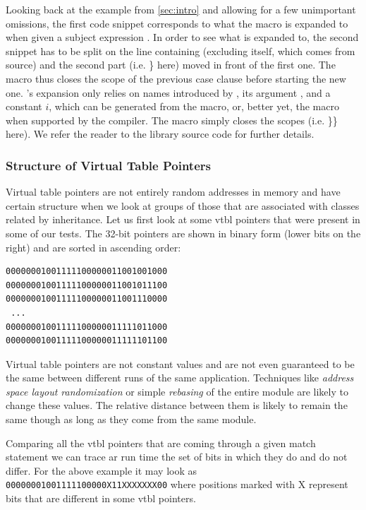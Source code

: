 Looking back at the example from \textsection\ref{sec:intro} and allowing for a few 
unimportant omissions, the first code snippet corresponds to what the macro 
 is expanded to when given a subject expression . In order to 
see what  is expanded to, the second snippet has to be split on 
the line containing  (excluding  itself, which comes from 
source) and the second part (i.e. \} here) moved in front of the first one. The 
macro thus closes the scope of the previous case clause before starting the new 
one. 's expansion only relies on names introduced by , 
its argument , and a constant $i$, which can be generated from the
 macro, or, better yet, the  macro when 
supported by the compiler. The  macro simply closes the scopes 
(i.e. \}\} here). We refer the reader to the library source code for 
further details.

\subsubsection{Structure of Virtual Table Pointers}
\label{sec:sovtp}

Virtual table pointers are not entirely random addresses in memory and have 
certain structure when we look at groups of those that are associated with 
classes related by inheritance. Let us first look at some vtbl pointers that 
were present in some of our tests. The 32-bit pointers are shown in binary form 
(lower bits on the right) and are sorted in ascending order:

\begin{verbatim}
00000001001111100000011001001000
00000001001111100000011001011100
00000001001111100000011001110000
 ...
00000001001111100000011111011000
00000001001111100000011111101100
\end{verbatim}

Virtual table pointers are not constant values and are not even guaranteed to be 
the same between different runs of the same application. Techniques like 
\emph{address space layout randomization} or simple \emph{rebasing} of the entire 
module are likely to change these values. The relative distance between them is 
likely to remain the same though as long as they come from the same module.

Comparing all the vtbl pointers that are coming through a given match statement 
we can trace ar run time the set of bits in which they do and do not differ. 
For the above example it may look as \texttt{00000001001111100000X11XXXXXXX00} 
where positions marked with X represent bits that are different in some vtbl 
pointers.

